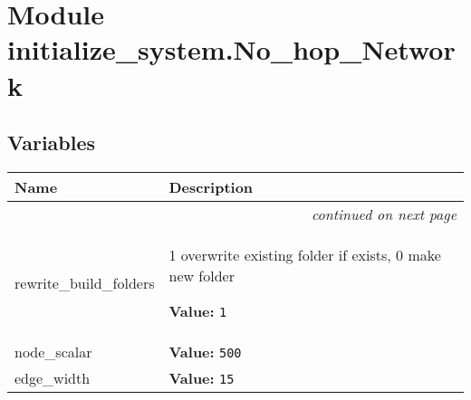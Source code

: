 %
%
%


\section{Module initialize\_system.No\_hop\_Network}

    \label{initialize_system:No_hop_Network}


  \subsection{Variables}

    \vspace{-1cm}
\hspace{\varindent}\begin{longtable}{|p{\varnamewidth}|p{\vardescrwidth}|l}
\cline{1-2}
\cline{1-2} \centering \textbf{Name} & \centering \textbf{Description}& \\
\cline{1-2}
\endhead\cline{1-2}\multicolumn{3}{r}{\small\textit{continued on next page}}\\\endfoot\cline{1-2}
\endlastfoot\raggedright r\-e\-w\-r\-i\-t\-e\-\_\-b\-u\-i\-l\-d\-\_\-f\-o\-l\-d\-e\-r\-s\- & \raggedright 1 overwrite existing folder if exists, 0 make new folder

\textbf{Value:} 
{\tt 1}&\\
\cline{1-2}
\raggedright n\-o\-d\-e\-\_\-s\-c\-a\-l\-a\-r\- & \raggedright \textbf{Value:} 
{\tt 500}&\\
\cline{1-2}
\raggedright e\-d\-g\-e\-\_\-w\-i\-d\-t\-h\- & \raggedright \textbf{Value:} 
{\tt 15}&\\
\cline{1-2}
\end{longtable}



